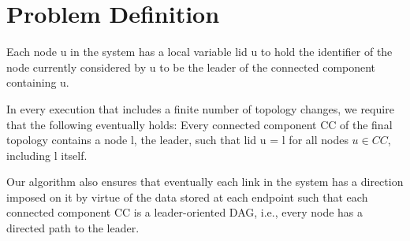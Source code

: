 \section{Problem Definition}
Each node u in the system has a local variable lid u to hold the identifier of the node currently considered by u to be the leader of the connected component containing u.

In every execution that includes a finite number of topology changes, we require that the following eventually holds:
Every connected component CC of the final topology contains a node l, the leader, such that lid u = l for all nodes $u \in CC$, including l itself.

Our algorithm also ensures that eventually each link in the system has a direction imposed on it by virtue of the data stored at each endpoint such that each connected component CC is a leader-oriented DAG, i.e., every node has a directed path to the leader.
